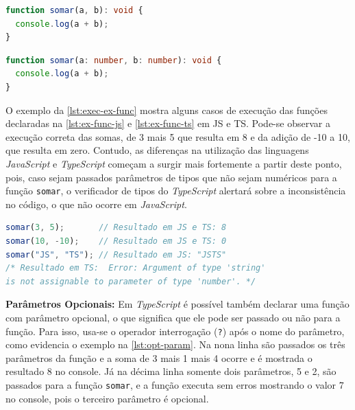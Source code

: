 \begin{lstlisting}[language=TypeScript, caption=Exemplo de Declaração de Função com Parâmetros em JS., label=lst:ex-func-js]
function somar(a, b): void {
  console.log(a + b);
}
\end{lstlisting}

\begin{lstlisting}[language=TypeScript, caption=Exemplo de Declaração de Função com Parâmetros em TS., label=lst:ex-func-ts]
function somar(a: number, b: number): void {
  console.log(a + b);
}
\end{lstlisting}

O exemplo da \autoref{lst:exec-ex-func} mostra alguns casos de execução das funções declaradas na \autoref{lst:ex-func-js} e \autoref{lst:ex-func-ts} em JS e TS. Pode-se observar a execução correta das somas, de 3 mais 5 que resulta em 8 e da adição de -10 a 10, que resulta em zero. Contudo, as diferenças na utilização das linguagens \textit{JavaScript} e \textit{TypeScript} começam a surgir mais fortemente a partir deste ponto, pois, caso sejam passados parâmetros de tipos que não sejam numéricos para a função \texttt{somar}, o verificador de tipos do \textit{TypeScript} alertará sobre a inconsistência no código, o que não ocorre em \textit{JavaScript}.



\Needspace{0.3\textheight}
\begin{lstlisting}[language=TypeScript, caption=Exemplos de Execução de Função em JS e TS., label=lst:exec-ex-func]
somar(3, 5);       // Resultado em JS e TS: 8
somar(10, -10);    // Resultado em JS e TS: 0
somar("JS", "TS"); // Resultado em JS: "JSTS"
/* Resultado em TS:  Error: Argument of type 'string' 
is not assignable to parameter of type 'number'. */
\end{lstlisting}



\textbf{Parâmetros Opcionais:} Em \textit{TypeScript} é possível também declarar uma função com parâmetro opcional, o que significa que ele pode ser passado ou não para a função. Para isso, usa-se o operador interrogação (\texttt{?}) após o nome do parâmetro, como evidencia o exemplo na \autoref{lst:opt-param}. Na nona linha são passados os três parâmetros da função e a soma de 3 mais 1 mais 4 ocorre e é mostrada o resultado 8 no console. Já na décima linha somente dois parâmetros, 5 e 2, são passados para a função \texttt{somar}, e a função executa sem erros mostrando o valor 7 no console, pois o terceiro parâmetro é opcional.


